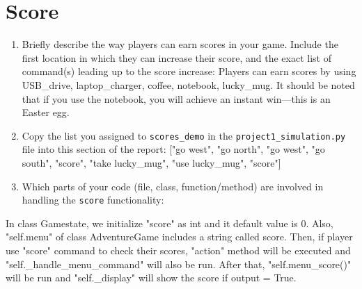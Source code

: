 \documentclass[11pt]{article}
\begin{document}
\section*{Score}
\begin{enumerate}

    \item Briefly describe the way players can earn scores in your game. Include the first location in which they can increase their score, and the exact list of command(s) leading up to the score increase:
Players can earn scores by using USB\_drive, laptop\_charger, coffee, notebook, lucky\_mug. It should be noted that if you use the notebook, you will achieve an instant win—this is an Easter egg.

    \item Copy the list you assigned to \texttt{scores\_demo} in the \texttt{project1\_simulation.py} file into this section of the report:
["go west", "go north", "go west", "go south", "score", "take lucky\_mug", "use lucky\_mug", "score"]

    \item Which parts of your code (file, class, function/method) are involved in handling the \texttt{score} functionality:

\end{enumerate}
In class Gamestate, we initialize "score" as int and it default value is 0. Also, "self.menu" of class AdventureGame includes a string called score. Then, if player use "score" command to check their scores, "action" method will be executed and "self.\_handle\_menu\_command" will also be run. After that, "self.menu\_score()" will be run and "self.\_display" will show the score if output = True.
\end{document}

